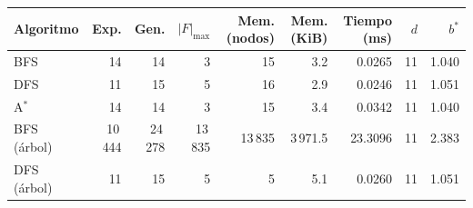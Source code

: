 \begin{tabular}{@{}lrrrrrrrr@{}}
\toprule
Algoritmo & Exp. & Gen. & $|F|_{\max}$ & Mem. (nodos) & Mem. (KiB) & Tiempo (ms) & $d$ & $b^*$ \\
\midrule
BFS & 14 & 14 & 3 & 15 & 3.2 & 0.0265 & 11 & 1.040 \\
DFS & 11 & 15 & 5 & 16 & 2.9 & 0.0246 & 11 & 1.051 \\
A$^*$ & 14 & 14 & 3 & 15 & 3.4 & 0.0342 & 11 & 1.040 \\
\midrule
BFS (árbol) & 10\,444 & 24\,278 & 13\,835 & 13\,835 & 3\,971.5 & 23.3096 & 11 & 2.383 \\
DFS (árbol) & 11 & 15 & 5 & 5 & 5.1 & 0.0260 & 11 & 1.051 \\
\bottomrule
\end{tabular}
